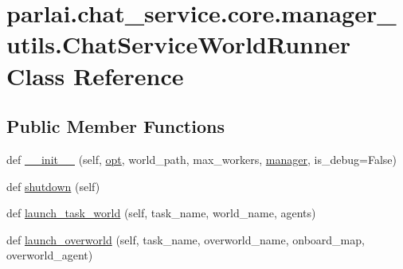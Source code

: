\hypertarget{classparlai_1_1chat__service_1_1core_1_1manager__utils_1_1ChatServiceWorldRunner}{}\section{parlai.\+chat\+\_\+service.\+core.\+manager\+\_\+utils.\+Chat\+Service\+World\+Runner Class Reference}
\label{classparlai_1_1chat__service_1_1core_1_1manager__utils_1_1ChatServiceWorldRunner}
\subsection*{Public Member Functions}
\begin{DoxyCompactItemize}
\item 
def \hyperlink{classparlai_1_1chat__service_1_1core_1_1manager__utils_1_1ChatServiceWorldRunner_a01462412e195b5788e5cfd3a769f0c0d}{\+\_\+\+\_\+init\+\_\+\+\_\+} (self, \hyperlink{classparlai_1_1chat__service_1_1core_1_1manager__utils_1_1ChatServiceWorldRunner_aa4e0d4e5b87f4c136b0750cea2c339be}{opt}, world\+\_\+path, max\+\_\+workers, \hyperlink{classparlai_1_1chat__service_1_1core_1_1manager__utils_1_1ChatServiceWorldRunner_aebacdd9b5d3ab6a093945f22e0fe0a83}{manager}, is\+\_\+debug=False)
\item 
def \hyperlink{classparlai_1_1chat__service_1_1core_1_1manager__utils_1_1ChatServiceWorldRunner_a5bf689cb8ff9889da98990ad770fd9a3}{shutdown} (self)
\item 
def \hyperlink{classparlai_1_1chat__service_1_1core_1_1manager__utils_1_1ChatServiceWorldRunner_ac6b8bd46cafa3ce7a5a74f4c1c35b8a8}{launch\+\_\+task\+\_\+world} (self, task\+\_\+name, world\+\_\+name, agents)
\item 
def \hyperlink{classparlai_1_1chat__service_1_1core_1_1manager__utils_1_1ChatServiceWorldRunner_a3333ef43d6fb9f0ffcc79b8e639967b0}{launch\+\_\+overworld} (self, task\+\_\+name, overworld\+\_\+name, onboard\+\_\+map, overworld\+\_\+agent)
\end{DoxyCompactItemize}

